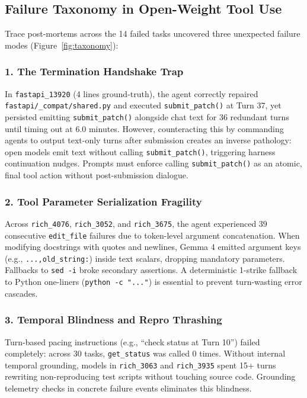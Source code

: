 \documentclass[10pt,twocolumn,letterpaper]{article}
\begin{document}
\subsection{Failure Taxonomy in Open-Weight Tool Use}
Trace post-mortems across the 14 failed tasks uncovered three unexpected failure modes (Figure~\ref{fig:taxonomy}):

\subsubsection{1. The Termination Handshake Trap}
In \texttt{fastapi\_13920} (4 lines ground-truth), the agent correctly repaired \texttt{fastapi/\_compat/shared.py} and executed \texttt{submit\_patch()} at Turn 37, yet persisted emitting \texttt{submit\_patch()} alongside chat text for 36 redundant turns until timing out at 6.0 minutes. However, counteracting this by commanding agents to output text-only turns after submission creates an inverse pathology: open models emit text without calling \texttt{submit\_patch()}, triggering harness continuation nudges. Prompts must enforce calling \texttt{submit\_patch()} as an atomic, final tool action without post-submission dialogue.

\subsubsection{2. Tool Parameter Serialization Fragility}
Across \texttt{rich\_4076}, \texttt{rich\_3052}, and \texttt{rich\_3675}, the agent experienced 39 consecutive \texttt{edit\_file} failures due to token-level argument concatenation. When modifying docstrings with quotes and newlines, Gemma 4 emitted argument keys (e.g., \texttt{...,old\_string:}) inside text scalars, dropping mandatory parameters. Fallbacks to \texttt{sed -i} broke secondary assertions. A deterministic 1-strike fallback to Python one-liners (\texttt{python -c "..."}) is essential to prevent turn-wasting error cascades.

\subsubsection{3. Temporal Blindness and Repro Thrashing}
Turn-based pacing instructions (e.g., ``check status at Turn 10'') failed completely: across 30 tasks, \texttt{get\_status} was called 0 times. Without internal temporal grounding, models in \texttt{rich\_3063} and \texttt{rich\_3935} spent 15+ turns rewriting non-reproducing test scripts without touching source code. Grounding telemetry checks in concrete failure events eliminates this blindness.
\end{document}
